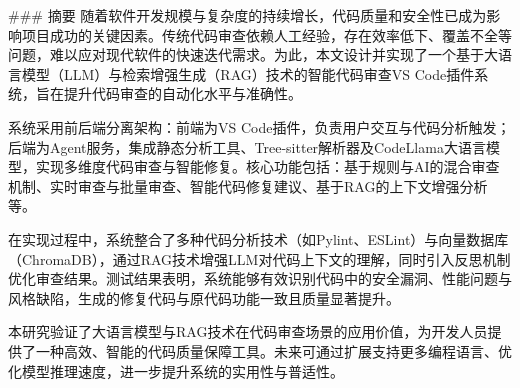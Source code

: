 


\begin{abstractcn}
### 摘要  
随着软件开发规模与复杂度的持续增长，代码质量和安全性已成为影响项目成功的关键因素。传统代码审查依赖人工经验，存在效率低下、覆盖不全等问题，难以应对现代软件的快速迭代需求。为此，本文设计并实现了一个基于大语言模型（LLM）与检索增强生成（RAG）技术的智能代码审查VS Code插件系统，旨在提升代码审查的自动化水平与准确性。

系统采用前后端分离架构：前端为VS Code插件，负责用户交互与代码分析触发；后端为Agent服务，集成静态分析工具、Tree-sitter解析器及CodeLlama大语言模型，实现多维度代码审查与智能修复。核心功能包括：基于规则与AI的混合审查机制、实时审查与批量审查、智能代码修复建议、基于RAG的上下文增强分析等。

在实现过程中，系统整合了多种代码分析技术（如Pylint、ESLint）与向量数据库（ChromaDB），通过RAG技术增强LLM对代码上下文的理解，同时引入反思机制优化审查结果。测试结果表明，系统能够有效识别代码中的安全漏洞、性能问题与风格缺陷，生成的修复代码与原代码功能一致且质量显著提升。

本研究验证了大语言模型与RAG技术在代码审查场景的应用价值，为开发人员提供了一种高效、智能的代码质量保障工具。未来可通过扩展支持更多编程语言、优化模型推理速度，进一步提升系统的实用性与普适性。


\end{abstractcn}
